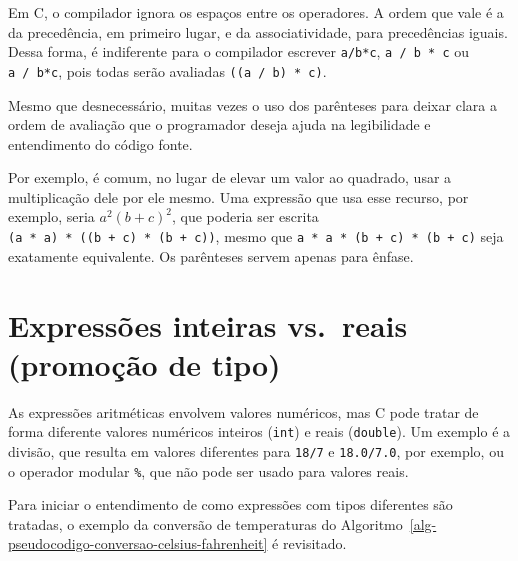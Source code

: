 \documentclass[
  11pt,
  a4paper,
]{scrbook}
\begin{document}
\begin{tcolorbox}[enhanced jigsaw, arc=.35mm, bottomtitle=1mm, colbacktitle=quarto-callout-tip-color!10!white, title=\textcolor{quarto-callout-tip-color}{\faLightbulb}\hspace{0.5em}{Dica}, toprule=.15mm, left=2mm, opacityback=0, colback=white, colframe=quarto-callout-tip-color-frame, opacitybacktitle=0.6, bottomrule=.15mm, leftrule=.75mm, toptitle=1mm, coltitle=black, titlerule=0mm, rightrule=.15mm, breakable]

Em C, o compilador ignora os espaços entre os operadores. A ordem que
vale é a da precedência, em primeiro lugar, e da associatividade, para
precedências iguais. Dessa forma, é indiferente para o compilador
escrever \texttt{a/b*c}, \texttt{a\ /\ b\ *\ c} ou \texttt{a\ /\ b*c},
pois todas serão avaliadas \texttt{((a\ /\ b)\ *\ c)}.

Mesmo que desnecessário, muitas vezes o uso dos parênteses para deixar
clara a ordem de avaliação que o programador deseja ajuda na
legibilidade e entendimento do código fonte.

Por exemplo, é comum, no lugar de elevar um valor ao quadrado, usar a
multiplicação dele por ele mesmo. Uma expressão que usa esse recurso,
por exemplo, seria \(a^2(b+c)^2\), que poderia ser escrita
\texttt{(a\ *\ a)\ *\ ((b\ +\ c)\ *\ (b\ +\ c))}, mesmo que
\texttt{a\ *\ a\ *\ (b\ +\ c)\ *\ (b\ +\ c)} seja exatamente
equivalente. Os parênteses servem apenas para ênfase.

\end{tcolorbox}

\section{Expressões inteiras vs.~reais (promoção de
tipo)}\label{expressuxf5es-inteiras-vs.-reais-promouxe7uxe3o-de-tipo}

As expressões aritméticas envolvem valores numéricos, mas C pode tratar
de forma diferente valores numéricos inteiros (\texttt{int}) e reais
(\texttt{double}). Um exemplo é a divisão, que resulta em valores
diferentes para \texttt{18/7} e \texttt{18.0/7.0}, por exemplo, ou o
operador modular \texttt{\%}, que não pode ser usado para valores reais.

Para iniciar o entendimento de como expressões com tipos diferentes são
tratadas, o exemplo da conversão de temperaturas do
Algoritmo~\ref{alg-pseudocodigo-conversao-celsius-fahrenheit} é
revisitado.
\end{document}
